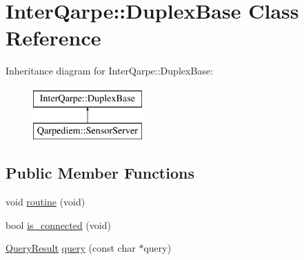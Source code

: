 \hypertarget{classInterQarpe_1_1DuplexBase}{}\section{Inter\+Qarpe\+:\+:Duplex\+Base Class Reference}
\label{classInterQarpe_1_1DuplexBase}
Inheritance diagram for Inter\+Qarpe\+:\+:Duplex\+Base\+:\begin{figure}[H]
\begin{center}
\leavevmode
\includegraphics[height=2.000000cm]{classInterQarpe_1_1DuplexBase}
\end{center}
\end{figure}
\subsection*{Public Member Functions}
\begin{DoxyCompactItemize}
\item 
void \hyperlink{classInterQarpe_1_1DuplexBase_a9b9fd5a27079a505aa8f1bcf465efc3c}{routine} (void)
\item 
bool \hyperlink{classInterQarpe_1_1DuplexBase_a734993799429420b6e0554c5afce074a}{is\+\_\+connected} (void)
\item 
\hyperlink{classInterQarpe_1_1QueryResult}{Query\+Result} \hyperlink{classInterQarpe_1_1DuplexBase_a1b3a0a47a6f8c3d6a50959484d118a51}{query} (const char $\ast$query)
\end{DoxyCompactItemize}
